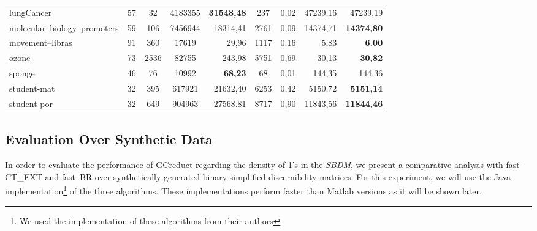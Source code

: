 \documentclass[authoryear,preprint,review,12pt]{elsarticle}
\begin{document}
\begin{table}[!htb]
\begin{tabular}{|l|c|c|c|r|c|c|r|r|}
			lungCancer & 57 & 32 & 4183355 & \textbf{31548,48} & 237 & 0,02 & 47239,16 & 47239,19 \\ %
			molecular--biology--promoters & 59 & 106 & 7456944 & 18314,41 & 2761 & 0,09 & 14374,71 & \textbf{14374,80} \\ %
			movement--libras & 91 & 360 & 17619 & 29,96 & 1117 & 0,16 & 5,83 & \textbf{6.00} \\ %
			ozone & 73 & 2536 & 82755 & 243,98 & 5751 & 0,69 & 30,13 & \textbf{30,82} \\ %
			sponge & 46 & 76 & 10992 & \textbf{68,23} & 68 & 0,01 & 144,35 & 144,36 \\ %
			student-mat & 32 & 395 & 617921 & 21632,40 & 6253 & 0,42 & 5150,72 & \textbf{5151,14}\\
			student-por & 32 & 649 & 904963 & 27568.81 & 8717 & 0,90 & 11843,56 & \textbf{11844,46} \\
    		\hline
    	\end{tabular}
    \end{table}
    

\subsection{Evaluation Over Synthetic Data}
	In order to evaluate the performance of GCreduct regarding the density of 1's in the \textit{SBDM}, we present a comparative analysis with fast--CT\_EXT and fast--BR over synthetically generated binary simplified discernibility matrices. For this experiment, we will use the Java implementation\footnote{We used the implementation of these algorithms from their authors} of the three algorithms. These implementations perform faster than Matlab versions as it will be shown later.
	
\end{document}
